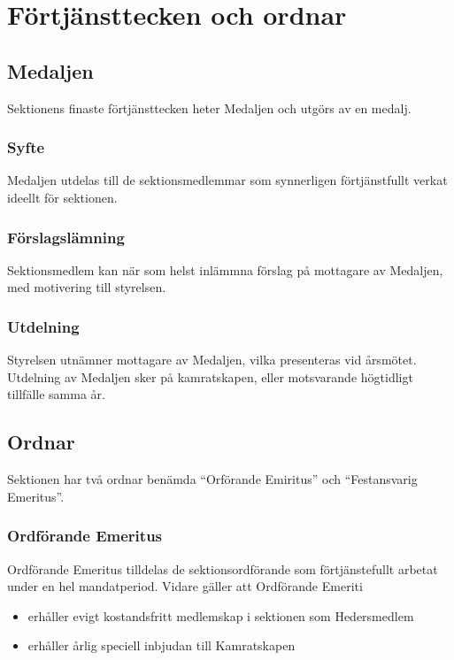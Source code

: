 \documentclass{../resources/dgovdoc}
\begin{document}
\section{Förtjänsttecken och ordnar}

\subsection{Medaljen}

Sektionens finaste förtjänsttecken heter Medaljen och utgörs av en medalj. 

\subsubsection{Syfte}

Medaljen utdelas till de sektionsmedlemmar som synnerligen förtjänstfullt verkat ideellt för sektionen. 

\subsubsection{Förslagslämning}

Sektionsmedlem kan när som helst inlämmna förslag på mottagare av Medaljen, med motivering till styrelsen. 

\subsubsection{Utdelning}

Styrelsen utnämner mottagare av Medaljen, vilka presenteras vid årsmötet. Utdelning av Medaljen sker på kamratskapen, eller motsvarande högtidligt tillfälle samma år. 

\subsection{Ordnar}

Sektionen har två ordnar benämda ``Orförande Emiritus'' och ``Festansvarig Emeritus''.

\subsubsection{Ordförande Emeritus}

Ordförande Emeritus tilldelas de sektionsordförande som förtjänstefullt arbetat under en hel mandatperiod. 
    Vidare gäller att Ordförande Emeriti
\begin{itemize}
\item erhåller evigt kostandsfritt medlemskap i sektionen som Hedersmedlem
\item erhåller årlig speciell inbjudan till Kamratskapen
\end{itemize}
\end{document}
